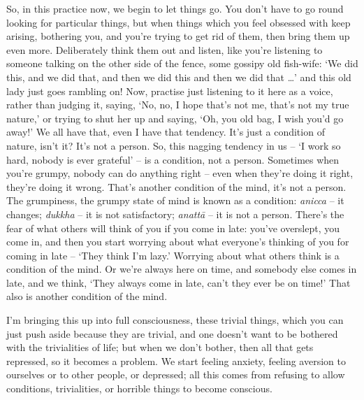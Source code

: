 So, in this practice now, we begin to let things go. You don't have to go round looking for particular things, but when things which you feel obsessed with keep arising, bothering you, and you're trying to get rid of them, then bring them up even more. Deliberately think them out and listen, like you're listening to someone talking on the other side of the fence, some gossipy old fish-wife: `We did this, and we did that, and then we did this and then we did that \ldots{}' and this old lady just goes rambling on! Now, practise just listening to it here as a voice, rather than judging it, saying, `No, no, I hope that's not me, that's not my true nature,' or trying to shut her up and saying, `Oh, you old bag, I wish you'd go away!' We all have that, even I have that tendency. It's just a condition of nature, isn't it? It's not a person. So, this nagging tendency in us -- `I work so hard, nobody is ever grateful' -- is a condition, not a person. Sometimes when you're grumpy, nobody can do anything right -- even when they're doing it right, they're doing it wrong. That's another condition of the mind, it's not a person. The grumpiness, the grumpy state of mind is known as a condition: \textit{anicca} -- it changes; \textit{dukkha} -- it is not satisfactory; \textit{anattā} -- it is not a person. There's the fear of what others will think of you if you come in late: you've overslept, you come in, and then you start worrying about what everyone's thinking of you for coming in late -- `They think I'm lazy.' Worrying about what others think is a condition of the mind. Or we're always here on time, and somebody else comes in late, and we think, `They always come in late, can't they ever be on time!' That also is another condition of the mind.

I'm bringing this up into full consciousness, these trivial things, which you can just push aside because they are trivial, and one doesn't want to be bothered with the trivialities of life; but when we don't bother, then all that gets repressed, so it becomes a problem. We start feeling anxiety, feeling aversion to ourselves or to other people, or depressed; all this comes from refusing to allow conditions, trivialities, or horrible things to become conscious.

